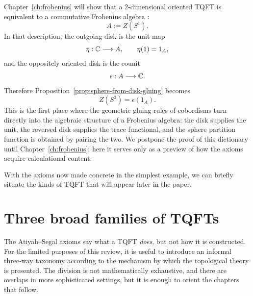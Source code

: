 Chapter~\ref{ch:frobenius} will show that a 2-dimensional oriented TQFT is equivalent to a commutative Frobenius algebra \cite{Kock2004Frobenius}:
\begin{equation}\label{eq:frobenius-preview-algebra}
A := Z(S^1).
\end{equation}
In that description, the outgoing disk is the unit map
\begin{equation}\label{eq:unit-map-preview}
\eta : \mathbb{C} \longrightarrow A,
\qquad
\eta(1) = 1_A,
\end{equation}
and the oppositely oriented disk is the counit
\begin{equation}\label{eq:counit-map-preview}
\epsilon : A \longrightarrow \mathbb{C}.
\end{equation}
Therefore Proposition~\ref{prop:sphere-from-disk-gluing} becomes
\begin{equation}\label{eq:ZS2-epsilon1}
Z(S^2) = \epsilon(1_A).
\end{equation}
This is the first place where the geometric gluing rules of cobordisms turn directly into the algebraic structure of a Frobenius algebra: the disk supplies the unit, the reversed disk supplies the trace functional, and the sphere partition function is obtained by pairing the two. We postpone the proof of this dictionary until Chapter~\ref{ch:frobenius}; here it serves only as a preview of how the axioms acquire calculational content.

\medskip

\noindent With the axioms now made concrete in the simplest example, we can briefly situate the kinds of TQFT that will appear later in the paper.

\section{Three broad families of TQFTs}\label{sec:tqft-taxonomy}

The Atiyah--Segal axioms say what a TQFT \emph{does}, but not how it is constructed. For the limited purposes of this review, it is useful to introduce an informal three-way taxonomy according to the mechanism by which the topological theory is presented. The division is not mathematically exhaustive, and there are overlaps in more sophisticated settings, but it is enough to orient the chapters that follow.

